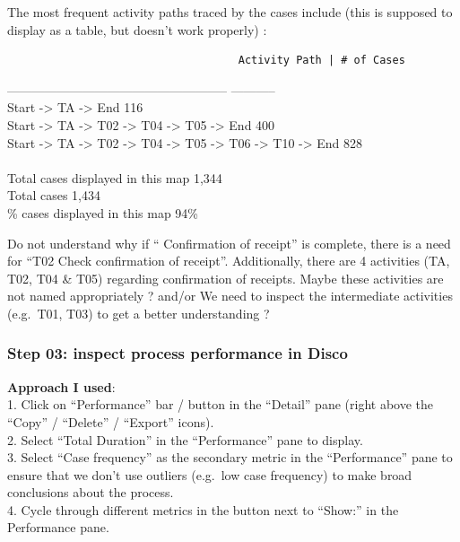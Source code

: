 \documentclass[]{article}
\begin{document}
The most frequent activity paths traced by the cases include (this is
supposed to display as a table, but doesn't work properly) :

\begin{verbatim}
                                    Activity Path | # of Cases  
\end{verbatim}

----------------------------------------------------- \textbar{}
-----------\\ Start -\textgreater{} TA -\textgreater{} End \textbar{}
116\\ Start -\textgreater{} TA -\textgreater{} T02 -\textgreater{} T04
-\textgreater{} T05 -\textgreater{} End \textbar{} 400\\Start
-\textgreater{} TA -\textgreater{} T02 -\textgreater{} T04
-\textgreater{} T05 -\textgreater{} T06 -\textgreater{} T10
-\textgreater{} End \textbar{} 828\\ \textbar{}\\ Total cases displayed
in this map \textbar{} 1,344\\ Total cases \textbar{} 1,434\\ \% cases
displayed in this map \textbar{} 94\%

Do not understand why if `` Confirmation of receipt'' is complete, there
is a need for ``T02 Check confirmation of receipt''. Additionally, there
are 4 activities (TA, T02, T04 \& T05) regarding confirmation of
receipts. Maybe these activities are not named appropriately ? and/or We
need to inspect the intermediate activities (e.g.~T01, T03) to get a
better understanding ?

\subsubsection{Step 03: inspect process performance in
Disco}\label{step-03-inspect-process-performance-in-disco}

\textbf{Approach I used}:\\1. Click on ``Performance'' bar / button in
the ``Detail'' pane (right above the ``Copy'' / ``Delete'' / ``Export''
icons).\\2. Select ``Total Duration'' in the ``Performance'' pane to
display.\\3. Select ``Case frequency'' as the secondary metric in the
``Performance'' pane to ensure that we don't use outliers (e.g.~low case
frequency) to make broad conclusions about the process.\\4. Cycle
through different metrics in the button next to ``Show:'' in the
Performance pane.
\end{document}
